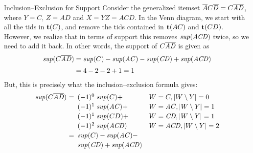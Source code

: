 \begin{frame}{Inclusion--Exclusion for Support}
Consider the generalized itemset
$\overline{A}C\overline{D} = C\overline{\mathit{AD}}$, where $Y=C$, $Z=\mathit{AD}$ and $X=\mathit{YZ}=\mathit{ACD}$.
In the Venn diagram,
we start with all the tids in ${\mathbf{t}}(C)$,
and remove the tids contained in ${\mathbf{t}}(AC)$ and ${\mathbf{t}}(CD)$.
However, we
realize that in terms of support this removes $\mathit{sup}(\mathit{ACD})$ twice, so we need to add
it back. In other words, the support of $C\overline{\mathit{AD}}$ is given as
\begin{align*}
\mathit{sup}(C\overline{\mathit{AD}}) &= \mathit{sup}(C) - \mathit{sup}(\mathit{AC}) - \mathit{sup}(\mathit{CD}) + \mathit{sup}(\mathit{ACD})\\[2pt]
  & = 4-2-2+1=1
\end{align*}
But, this is precisely what the inclusion--exclusion formula gives:
\begin{align*}
\begin{array}{@{}l@{\,\,}c@{\,}ll@{}}
\supp(C\ol{\mathit{AD}}) &= &~ (-1)^0 \;\supp(C)+ &  {W = C,  |W\setminus Y| = 0}\\[2pt]
                &  &~  (-1)^1 \;\supp(\mathit{AC})+ &  {W = \mathit{AC}, |W\setminus Y| = 1}\\[2pt]
                &  &~  (-1)^1 \;\supp(CD)+ &  {W = \mathit{CD}, |W\setminus Y| = 1}\\[2pt]
                &  &~   (-1)^2 \;\supp(\mathit{ACD})& {W = \mathit{ACD}, |W\setminus Y| = 2}\\[2pt]
                &= &~ \supp(C) - \supp(\mathit{AC}) -  & \\[2pt]
                &  &~ \supp(\mathit{CD}) + \supp(\mathit{ACD}) & \\
\end{array}
\end{align*}
\end{frame}


